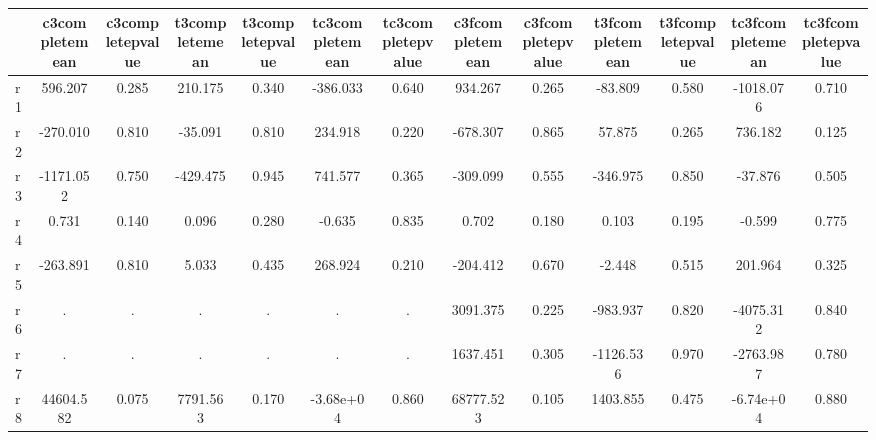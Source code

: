 \begin{table}[htbp]
\begin{tabular}{lcccccccccccc} \hline \hline
 & c3completemean  & c3completepvalue  & t3completemean  & t3completepvalue  & tc3completemean  & tc3completepvalue  & c3fcompletemean  & c3fcompletepvalue  & t3fcompletemean  & t3fcompletepvalue  & tc3fcompletemean  & tc3fcompletepvalue  \\  \hline 
r1 &   596.207 &     0.285 &   210.175 &     0.340 &  -386.033 &     0.640 &   934.267 &     0.265 &   -83.809 &     0.580 & -1018.076 &     0.710 \\  
r2 &  -270.010 &     0.810 &   -35.091 &     0.810 &   234.918 &     0.220 &  -678.307 &     0.865 &    57.875 &     0.265 &   736.182 &     0.125 \\  
r3 & -1171.052 &     0.750 &  -429.475 &     0.945 &   741.577 &     0.365 &  -309.099 &     0.555 &  -346.975 &     0.850 &   -37.876 &     0.505 \\  
r4 &     0.731 &     0.140 &     0.096 &     0.280 &    -0.635 &     0.835 &     0.702 &     0.180 &     0.103 &     0.195 &    -0.599 &     0.775 \\  
r5 &  -263.891 &     0.810 &     5.033 &     0.435 &   268.924 &     0.210 &  -204.412 &     0.670 &    -2.448 &     0.515 &   201.964 &     0.325 \\  
r6 &         . &         . &         . &         . &         . &         . &  3091.375 &     0.225 &  -983.937 &     0.820 & -4075.312 &     0.840 \\  
r7 &         . &         . &         . &         . &         . &         . &  1637.451 &     0.305 & -1126.536 &     0.970 & -2763.987 &     0.780 \\  
r8 & 44604.582 &     0.075 &  7791.563 &     0.170 & -3.68e+04 &     0.860 & 68777.523 &     0.105 &  1403.855 &     0.475 & -6.74e+04 &     0.880 \\  
\hline \hline \end{tabular}
\end{table}
